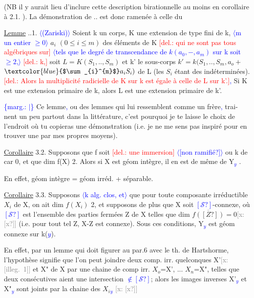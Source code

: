 \documentclass[11pt]{article}
\newcommand{\scanpage}[1]{\par\bigskip\noindent{\small\sffamily[scan #1]}\par}
\newcommand{\mspage}[1]{{\small\sffamily[p.\,#1]}}
\newcommand{\hand}[1]{\textcolor{blue}{#1}}
\let\over\relax
\newcommand{\over}[2]{\textcolor{gray}{#1}\textcolor{blue}{\ensuremath{^{\!\nearrow}}#2}}
\newcommand{\inserted}[2][]{\textcolor{blue}{$\langle$#2$\rangle$}}
\newcommand{\margin}[1]{\textcolor{blue}{\{\textsf{marg.:} #1\}}}
\newcommand{\deleted}[1]{\textcolor{red}{[\textsf{del.:} #1]}}
\newcommand{\xout}[1]{\textcolor{gray}{[\textsf{x:} #1]}}
\newcommand{\uline}[1]{\underline{#1}}
\newcommand{\unsure}[1]{[#1?]}
\newcommand{\illegible}[1]{[\textsf{illeg.\ #1}]}
\begin{document}
\clearpage
\scanpage{25/17}
\mspage{14}

(NB il y aurait lieu d'inclure cette description birationnelle au moins
en corollaire à 2.1. ). La démonstration de \over{\unsure{2}}{3}.\over{\unsure{2}}{1}. est donc ramenée à
celle du

\uline{Lemme} \over{\unsure{2}}{3}.\over{\unsure{2}}{1}.1. \inserted{(Zariski)} Soient k un corps, K une extension de type fini de k, \inserted[typed]{m un entier $\geqslant 0$}
$a_i$ $(0\leqslant i\leqslant m)$ des éléments de K \deleted{qui ne sont pas tous algébriques sur} \inserted{tels que le degré de transcendance de $k(a_0,-,a_m)$ sur k soit $\geqslant 2$,}
\deleted{k,} soit $L = K(S_1,..,S_m)$ et k' le sous-corps $k'= k(S_1,..,S_m,a_o +$
$\hand{$\sum_{i}^{m}$}a_iS_i)$ de L (les $S_i$ étant des indéterminées). \deleted{Alors la multiplicité
radicielle de K sur k est égale à celle de L sur k'.}\hand{,} Si K est une
extension primaire de k, alors L est une extension primaire de k'.

\margin{$|$} Ce lemme\hand{,} ou des lemmes qui lui ressemblent comme un frère\hand{,} trai-%
nent un peu partout dans la littérature, c'est pourquoi je te laisse le
choix de l'endroit où tu copieras une démonstration (i.e. je ne me sens
pas inspiré pour en trouver une par mes propres moyens).

\uline{Corollaire} 3.2. Supposons que f soit \deleted{une immersion} \inserted{\unsure{non ramifié}} ou k de car 0,
et que dim f(X)\over{$>$}{$\geqslant$} 2. Alors si X est géom intègre, il en est de même de
Y\hand{$_y$} .

En effet, géom intègre = géom irréd. + séparable.

\uline{Corollaire} 3.3. Supposons \inserted[typed]{k alg. clos, et} que pour toute composante irréductible $X_i$
de X, on ait dim $f(X_i)$\over{$>$}{$\geqslant$} 2, et supposons de plus que X soit \hand{$\unsure{\mathcal{S}}$}-connexe,
où \hand{$\unsure{\mathcal{S}}$} est l'ensemble des parties fermées Z de X telles que dim $\overline{f(\unsure{Z})}=0$\xout{\unsure{x}}
(i.e. pour tout tel Z, X-Z est connexe). Sous ces conditions, Y\hand{$_y$} est
géom connexe sur k(\hand{$y$}).

En effet, par un lemme qui doit figurer au par.6 avec le th. de
Hartshorme, l'hypothèse signifie que l'on peut joindre deux comp. irr.
quelconques X'\xout{\illegible{1}} et X" de X par une chaine de comp irr. $X_o$=X', ...
$X_n$=X", telles que deux consécutives aient une intersection \hand{$\notin\unsure{\mathcal{S}}$}; alors
les images inverses X'\hand{$_y$} et X"\hand{$_y$} sont joints par la chaine des $X_{i}$\hand{$_y$} \xout{\unsure{x}}
\end{document}
